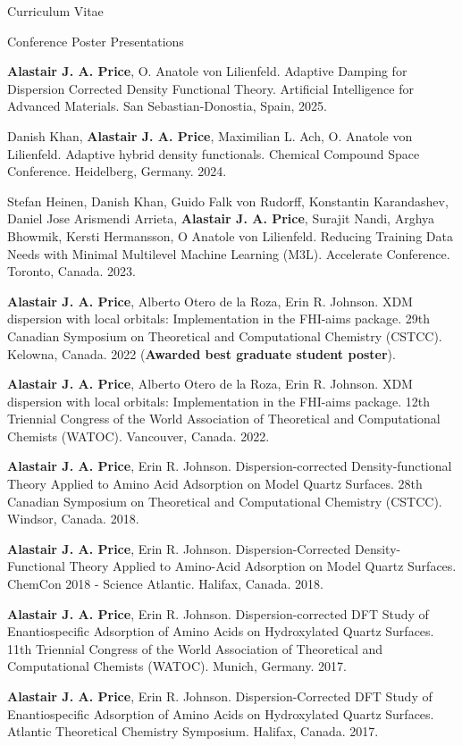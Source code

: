 \documentclass[a4paper,oneside,11pt]{article}
\begin{document}
\begin{cv}{Curriculum Vitae}
\setlength{\cvlabelwidth}{0.5cm}  \begin{cvlist}{Conference Poster Presentations}
      \item[9.]\textbf{Alastair J. A. Price}, O. Anatole von Lilienfeld. Adaptive Damping for Dispersion Corrected Density Functional Theory. Artificial Intelligence for Advanced Materials. San Sebastian-Donostia, Spain, 2025.   \item[8.] Danish Khan, \textbf{Alastair J. A. Price}, Maximilian L. Ach, O. Anatole von Lilienfeld. Adaptive hybrid density functionals. Chemical Compound Space Conference. Heidelberg, Germany. 2024.
      \item[7.] Stefan Heinen, Danish Khan, Guido Falk von Rudorff, Konstantin Karandashev, Daniel Jose Arismendi Arrieta, {\bf Alastair J. A. Price}, Surajit Nandi, Arghya Bhowmik, Kersti Hermansson, O Anatole von Lilienfeld. Reducing Training Data Needs with Minimal Multilevel Machine Learning (M3L). Accelerate Conference. Toronto, Canada. 2023.
      \item[6.] \textbf{Alastair J. A. Price}, Alberto Otero de la Roza, Erin R. Johnson. XDM dispersion with local orbitals: Implementation in the FHI-aims package. 29th Canadian Symposium on Theoretical and Computational Chemistry (CSTCC). Kelowna, Canada. 2022 ({\bf Awarded best graduate student poster}).
      \item[5.] \textbf{Alastair J. A. Price}, Alberto Otero de la Roza, Erin R. Johnson. XDM dispersion with local orbitals: Implementation in the FHI-aims package. 12th Triennial Congress of the World Association of Theoretical and Computational Chemists (WATOC). Vancouver, Canada. 2022.
      \item[4.] \textbf{Alastair J. A. Price}, Erin R. Johnson. Dispersion-corrected Density-functional Theory Applied to Amino Acid Adsorption on Model Quartz Surfaces. 28th Canadian Symposium on Theoretical and Computational Chemistry (CSTCC). Windsor, Canada. 2018.
      \item[3.] \textbf{Alastair J. A. Price}, Erin R. Johnson. Dispersion-Corrected Density-Functional Theory Applied to Amino-Acid Adsorption on Model Quartz Surfaces. ChemCon 2018 - Science Atlantic. Halifax, Canada. 2018.
      \item[2.] \textbf{Alastair J. A. Price}, Erin R. Johnson. Dispersion-corrected DFT Study of Enantiospecific Adsorption of Amino Acids on Hydroxylated Quartz Surfaces. 11th Triennial Congress of the World Association of Theoretical and Computational Chemists (WATOC). Munich, Germany. 2017.      
      \item[1.] \textbf{Alastair J. A. Price}, Erin R. Johnson. Dispersion-Corrected DFT Study of Enantiospecific Adsorption of Amino Acids on Hydroxylated Quartz Surfaces. Atlantic Theoretical Chemistry Symposium. Halifax, Canada. 2017.
  \end{cvlist}


\end{cv}
\end{document}
